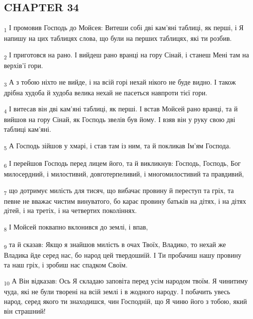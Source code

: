 \subsection{CHAPTER 34}
\begin{tcolorbox}
\textsubscript{1} І промовив Господь до Мойсея: Витеши собі дві кам'яні таблиці, як перші, і Я напишу на цих таблицях слова, що були на перших таблицях, які ти розбив.
\end{tcolorbox}
\begin{tcolorbox}
\textsubscript{2} І приготовся на рано. І вийдеш рано вранці на гору Сінай, і станеш Мені там на верхів'ї гори.
\end{tcolorbox}
\begin{tcolorbox}
\textsubscript{3} А з тобою ніхто не вийде, і на всій горі нехай нікого не буде видно. І також дрібна худоба й худоба велика нехай не пасеться навпроти тієї гори.
\end{tcolorbox}
\begin{tcolorbox}
\textsubscript{4} І витесав він дві кам'яні таблиці, як перші. І встав Мойсей рано вранці, та й вийшов на гору Сінай, як Господь звелів був йому. І взяв він у руку свою дві таблиці кам'яні.
\end{tcolorbox}
\begin{tcolorbox}
\textsubscript{5} А Господь зійшов у хмарі, і став там із ним, та й покликав Ім'ям Господа.
\end{tcolorbox}
\begin{tcolorbox}
\textsubscript{6} І перейшов Господь перед лицем його, та й викликнув: Господь, Господь, Бог милосердний, і милостивий, довготерпеливий, і многомилостивий та правдивий,
\end{tcolorbox}
\begin{tcolorbox}
\textsubscript{7} що дотримує милість для тисяч, що вибачає провину й переступ та гріх, та певне не вважає чистим винуватого, бо карає провину батьків на дітях, і на дітях дітей, і на третіх, і на четвертих поколіннях.
\end{tcolorbox}
\begin{tcolorbox}
\textsubscript{8} І Мойсей поквапно вклонився до землі, і впав,
\end{tcolorbox}
\begin{tcolorbox}
\textsubscript{9} та й сказав: Якщо я знайшов милість в очах Твоїх, Владико, то нехай же Владика йде серед нас, бо народ цей твердошиїй. І Ти пробачиш нашу провину та наш гріх, і зробиш нас спадком Своїм.
\end{tcolorbox}
\begin{tcolorbox}
\textsubscript{10} А Він відказав: Ось Я складаю заповіта перед усім народом твоїм. Я чинитиму чуда, які не були творені на всій землі і в жодного народу. І побачить увесь народ, серед якого ти знаходишся, чин Господній, що Я чиню його з тобою, який він страшний!
\end{tcolorbox}

